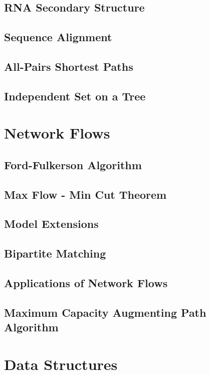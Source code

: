 \documentclass{article}
\begin{document}
\subsection{RNA Secondary Structure}
\subsection{Sequence Alignment}
\subsection{All-Pairs Shortest Paths}
\subsection{Independent Set on a Tree}
\newpage


\section{Network Flows}
\subsection{Ford-Fulkerson Algorithm}
\subsection{Max Flow - Min Cut Theorem}
\subsection{Model Extensions}
\subsection{Bipartite Matching}
\subsection{Applications of Network Flows}
\subsection{Maximum Capacity Augmenting Path Algorithm}
\newpage


\section{Data Structures}
\end{document}
